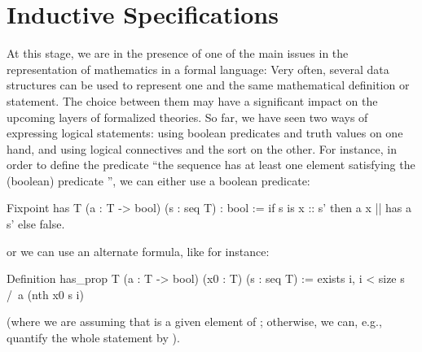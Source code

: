 \chapter{Inductive Specifications}{}
\label{ch:boolrefl}





At this stage, we are in the presence of one of the main issues in the
representation of mathematics in a formal language: Very often,
several data structures can be used to represent one and the same
mathematical definition or statement. The choice between them
may have a significant impact
on the upcoming layers of formalized theories. So far, we have seen two
ways of expressing logical statements: using boolean predicates and
truth values on one hand, and using logical connectives and the
 sort on the other. For instance, in order to define the
predicate ``the sequence  has at least one element satisfying the
(boolean) predicate '', we can either use a boolean predicate:

\begin{coq}{}{}
Fixpoint has T (a : T -> bool) (s : seq T) : bool :=
  if s is x :: s' then a x || has a s' else false.
\end{coq}

or we can use an alternate formula, like for instance:

\begin{coq}{}{}
Definition has_prop  T (a : T -> bool) (x0 : T) (s : seq T) :=
   exists i, i < size s /\ a (nth x0 s i)
\end{coq}

(where we are assuming that  is a given element of ;
otherwise, we can, e.g., quantify the whole statement by
).


